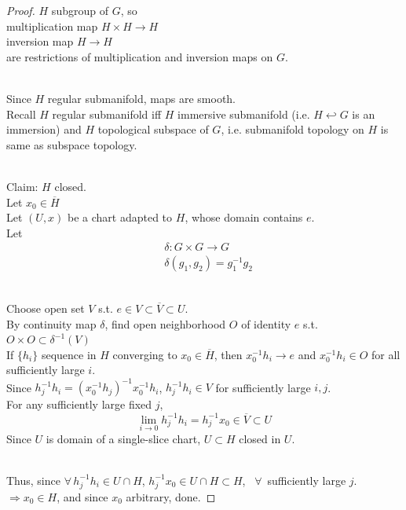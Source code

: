 \begin{proof}
$H$ subgroup of $G$, so \\
multiplication map $H\times H \to H$ \\
inversion map $H\to H$ \\
are restrictions of multiplication and inversion maps on $G$.

\qquad \\
Since $H$ regular submanifold, maps are smooth. \\
Recall $H$ regular submanifold iff $H$ immersive submanifold (i.e. $H\hookleftarrow G$ is an immersion) and $H$ topological subspace of $G$, i.e. submanifold topology on $H$ is same as subspace topology.

\quad \\ 
Claim: $H$ closed. \\
Let $x_0 \in \overline{H}$ \\
Let $(U,x)$ be a chart adapted to $H$, whose domain contains $e$. \\
Let 
\[
\begin{aligned}
& \delta : G \times G \to G \\
& \delta (g_1, g_2)  = g_1^{-1} g_2
\end{aligned}
\]

\quad \\ 
Choose open set $V$ s.t. $e\in V \subset \overline{V} \subset U$. \\
By continuity map $\delta$, find open neighborhood $O$ of identity $e$ s.t. $O \times O \subset \delta^{-1}(V)$ \\
If $\lbrace h_i \rbrace$ sequence in $H$ converging to $x_0 \in \overline{H}$, then $x_0^{-1} h_i \to e$ and $x_0^{-1} h_i \in O$ for all sufficiently large $i$.  \\
Since $h_j^{-1} h_i = (x_0^{-1} h_j)^{-1} x_0^{-1} h_i$, $h_j^{-1} h_i \in V$ for sufficiently large $i,j$.  \\

For any sufficiently large fixed $j$, 
\[
\lim_{i\to 0} h_j^{-1} h_i = h_j^{-1} x_0 \in \overline{V} \subset U
\]
Since $U$ is domain of a single-slice chart, $U\subset H$ closed in $U$.

\quad \\
Thus, since $\forall \, h_j^{-1} h_i \in U \cap H$, $h_j^{-1} x_0 \in U \cap H \subset H$, \quad \, $\forall \, $ sufficiently large $j$.  \\
$\Longrightarrow x_0 \in H$, and since $x_0$ arbitrary, done.
	
	
	\end{proof}


